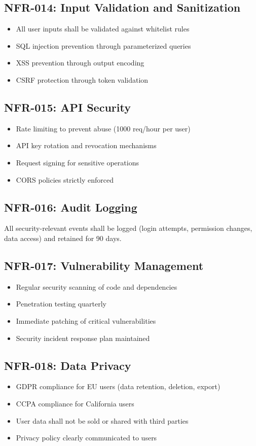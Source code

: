 \documentclass{report}
\begin{document}
\subsection{NFR-014: Input Validation and Sanitization}
\begin{itemize}
    \item All user inputs shall be validated against whitelist rules
    \item SQL injection prevention through parameterized queries
    \item XSS prevention through output encoding
    \item CSRF protection through token validation
\end{itemize}

\subsection{NFR-015: API Security}
\begin{itemize}
    \item Rate limiting to prevent abuse (1000 req/hour per user)
    \item API key rotation and revocation mechanisms
    \item Request signing for sensitive operations
    \item CORS policies strictly enforced
\end{itemize}

\subsection{NFR-016: Audit Logging}
All security-relevant events shall be logged (login attempts, permission changes, data access) and retained for 90 days.

\subsection{NFR-017: Vulnerability Management}
\begin{itemize}
    \item Regular security scanning of code and dependencies
    \item Penetration testing quarterly
    \item Immediate patching of critical vulnerabilities
    \item Security incident response plan maintained
\end{itemize}

\subsection{NFR-018: Data Privacy}
\begin{itemize}
    \item GDPR compliance for EU users (data retention, deletion, export)
    \item CCPA compliance for California users
    \item User data shall not be sold or shared with third parties
    \item Privacy policy clearly communicated to users
\end{itemize}
\end{document}
